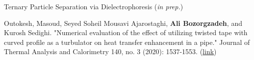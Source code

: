 %
%
%


\begin{scholarship}
  {
    Ternary Particle Separation via Dielectrophoresis (\emph{in prep.})
  }

  {
    Outokesh, Masoud, Seyed Soheil Mousavi Ajarostaghi, \textbf{Ali Bozorgzadeh}, and Kurosh Sedighi. "Numerical evaluation of the effect of utilizing twisted tape with curved profile as a turbulator on heat transfer enhancement in a pipe." Journal of Thermal Analysis and Calorimetry 140, no. 3 (2020): 1537-1553. (\href{https://link.springer.com/article/10.1007/s10973-020-09336-0}{link})
  }

\end{scholarship}
